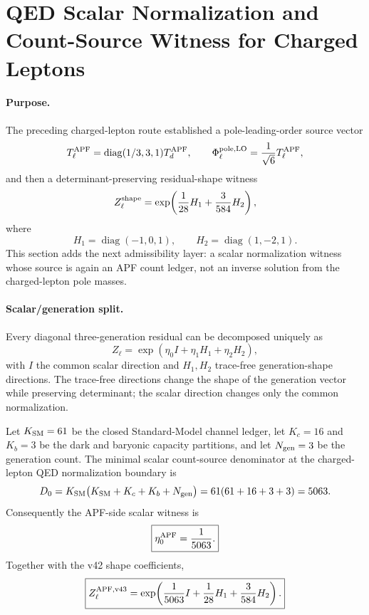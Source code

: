 
\section{QED Scalar Normalization and Count-Source Witness for Charged Leptons}\label{sec:v43_qed_scalar_count_source}

\paragraph{Purpose.}
The preceding charged-lepton route established a pole-leading-order source vector
\[
T_\ell^{\rm APF}=\operatorname{diag}(1/3,3,1)T_d^{\rm APF},
\qquad
\Phi_\ell^{\rm pole,LO}={1\over\sqrt6}T_\ell^{\rm APF},
\]
and then a determinant-preserving residual-shape witness
\[
Z_\ell^{\rm shape}=\exp\!\left({1\over28}H_1+{3\over584}H_2\right),
\]
where
\[
H_1=\operatorname{diag}(-1,0,1),\qquad
H_2=\operatorname{diag}(1,-2,1).
\]
This section adds the next admissibility layer: a scalar normalization witness whose source is again an APF count ledger, not an inverse solution from the charged-lepton pole masses.

\paragraph{Scalar/generation split.}
Every diagonal three-generation residual can be decomposed uniquely as
\[
Z_\ell=\exp(\eta_0 I+\eta_1H_1+\eta_2H_2),
\]
with $I$ the common scalar direction and $H_1,H_2$ trace-free generation-shape directions.  The trace-free directions change the shape of the generation vector while preserving determinant; the scalar direction changes only the common normalization.

\begin{theorem}\label{thm:v43_scalar_witness}
Let $K_{\rm SM}=61$ be the closed Standard-Model channel ledger, let $K_c=16$ and $K_b=3$ be the dark and baryonic capacity partitions, and let $N_{\rm gen}=3$ be the generation count.  The minimal scalar count-source denominator at the charged-lepton QED normalization boundary is
\[
D_0=K_{\rm SM}\bigl(K_{\rm SM}+K_c+K_b+N_{\rm gen}\bigr)
    =61(61+16+3+3)=5063.
\]
Consequently the APF-side scalar witness is
\[
\boxed{\eta_0^{\rm APF}={1\over5063}.}
\]
Together with the v42 shape coefficients,
\[
\boxed{
Z_\ell^{\rm APF,v43}
=\exp\!\left({1\over5063}I+{1\over28}H_1+{3\over584}H_2\right).
}
\]
\end{theorem}

